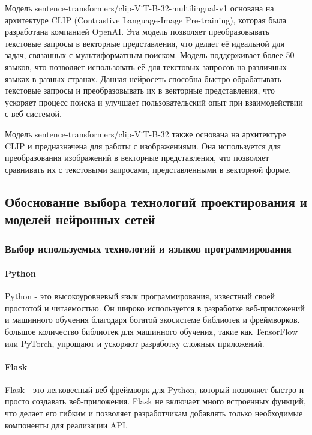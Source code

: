 Модель sentence-transformers/clip-ViT-B-32-multilingual-v1 основана на архитектуре CLIP (Contrastive Language-Image Pre-training), которая была разработана компанией OpenAI. Эта модель позволяет преобразовывать текстовые запросы в векторные представления, что делает её идеальной для задач, связанных с мультиформатным поиском. Модель поддерживает более 50 языков, что позволяет использовать её для текстовых запросов на различных языках в разных странах. Данная нейросеть способна быстро обрабатывать текстовые запросы и преобразовывать их в векторные представления, что ускоряет процесс поиска и улучшает пользовательский опыт при взаимодействии с веб-системой.

Модель sentence-transformers/clip-ViT-B-32 также основана на архитектуре CLIP и предназначена для работы с изображениями. Она используется для преобразования изображений в векторные представления, что позволяет сравнивать их с текстовыми запросами, представленными в векторной форме.

\subsection{Обоснование выбора технологий проектирования и моделей нейронных сетей}
\subsubsection{Выбор используемых технологий и языков программирования}

\paragraph{Python}

Python - это высокоуровневый язык программирования, известный своей простотой и читаемостью. Он широко используется в разработке веб-приложений и машинного обучения благодаря богатой экосистеме библиотек и фреймворков. большое количество библиотек для машинного обучения, такие как TensorFlow или PyTorch, упрощают и ускоряют разработку сложных приложений.

\paragraph{Flask}

Flask - это легковесный веб-фреймворк для Python, который позволяет быстро и просто создавать веб-приложения. Flask не включает много встроенных функций, что делает его гибким и позволяет разработчикам добавлять только необходимые компоненты для реализации API.

